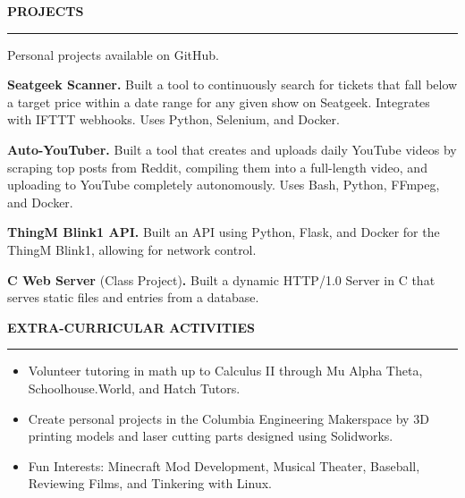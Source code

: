 \documentclass[10pt,letterpaper]{article}
\begin{document}

\medskip
\MakeUppercase{{\bf Projects}}
\medskip
\hrule
\begin{list}{}{\setlength{\leftmargin}{0em}}
    \item
          \vspace{-1.25em}
    \item {Personal projects available on GitHub. }
    \item \textbf{Seatgeek Scanner.} {Built a tool to continuously search for tickets that fall below a target price within a date range for any given show on Seatgeek. Integrates with IFTTT webhooks. Uses Python, Selenium, and Docker. }
    \item \textbf{Auto-YouTuber.} {Built a tool that creates and uploads daily YouTube videos by scraping top posts from Reddit, compiling them into a full-length video, and uploading to YouTube completely autonomously. Uses Bash, Python, FFmpeg, and Docker. }
    \item \textbf{ThingM Blink1 API.} {Built an API using Python, Flask, and Docker for the ThingM Blink1, allowing for network control.}
    \item \textbf{C Web Server} {(Class Project)\textbf{.} Built a dynamic HTTP/1.0 Server in C that serves static files and entries from a database.}
\end{list}


\medskip
\MakeUppercase{{\bf Extra-Curricular Activities}}
\medskip
\hrule
\begin{list}{}{\setlength{\leftmargin}{0em}}
    \item
          \begin{itemize}
              \item Volunteer tutoring in math up to Calculus II through Mu Alpha Theta, Schoolhouse.World, and Hatch Tutors.
              \item Create personal projects in the Columbia Engineering Makerspace by 3D printing models and laser cutting parts designed using Solidworks.
              \item Fun Interests: Minecraft Mod Development, Musical Theater, Baseball, Reviewing Films, and Tinkering with Linux.
          \end{itemize}
\end{list}
\end{document}
